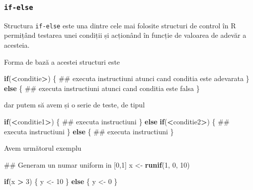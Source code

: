 \documentclass[]{article}
\newenvironment{Shaded}{\begin{snugshade}}{\end{snugshade}}
\newcommand{\KeywordTok}[1]{\textcolor[rgb]{0.13,0.29,0.53}{\textbf{#1}}}
\newcommand{\DecValTok}[1]{\textcolor[rgb]{0.00,0.00,0.81}{#1}}
\newcommand{\StringTok}[1]{\textcolor[rgb]{0.31,0.60,0.02}{#1}}
\newcommand{\ControlFlowTok}[1]{\textcolor[rgb]{0.13,0.29,0.53}{\textbf{#1}}}
\newcommand{\OperatorTok}[1]{\textcolor[rgb]{0.81,0.36,0.00}{\textbf{#1}}}
\newcommand{\NormalTok}[1]{#1}
\begin{document}
\subsubsection{\texorpdfstring{\texttt{if-else}}{if-else}}\label{if-else}

Structura \texttt{if-else} este una dintre cele mai folosite structuri
de control în R permițând testarea unei condiții și acționând în funcție
de valoarea de adevăr a acesteia.

Forma de bază a acestei structuri este

\begin{Shaded}
\begin{Highlighting}[]
\ControlFlowTok{if}\NormalTok{(}\OperatorTok{<}\NormalTok{conditie}\OperatorTok{>}\NormalTok{) \{}
\NormalTok{        ## executa instructiuni atunci cand conditia este adevarata}
\NormalTok{\} }
\ControlFlowTok{else}\NormalTok{ \{}
\NormalTok{        ## executa instructiuni atunci cand conditia este falsa}
\NormalTok{\}}
\end{Highlighting}
\end{Shaded}

dar putem să avem și o serie de teste, de tipul

\begin{Shaded}
\begin{Highlighting}[]
\ControlFlowTok{if}\NormalTok{(}\OperatorTok{<}\NormalTok{conditie1}\OperatorTok{>}\NormalTok{) \{}
\NormalTok{        ## executa instructiuni}
\NormalTok{\} }\ControlFlowTok{else} \ControlFlowTok{if}\NormalTok{(}\OperatorTok{<}\NormalTok{conditie2}\OperatorTok{>}\NormalTok{)  \{}
\NormalTok{        ## executa instructiuni}
\NormalTok{\} }\ControlFlowTok{else}\NormalTok{ \{}
\NormalTok{        ## executa instructiuni}
\NormalTok{\}}
\end{Highlighting}
\end{Shaded}

Avem următorul exemplu

\begin{Shaded}
\begin{Highlighting}[]
\NormalTok{## Generam un numar uniform in [0,1]}
\NormalTok{x <-}\StringTok{ }\KeywordTok{runif}\NormalTok{(}\DecValTok{1}\NormalTok{, }\DecValTok{0}\NormalTok{, }\DecValTok{10}\NormalTok{)  }

\ControlFlowTok{if}\NormalTok{(x }\OperatorTok{>}\StringTok{ }\DecValTok{3}\NormalTok{) \{}
\NormalTok{        y <-}\StringTok{ }\DecValTok{10}
\NormalTok{\} }\ControlFlowTok{else}\NormalTok{ \{}
\NormalTok{        y <-}\StringTok{ }\DecValTok{0}
\NormalTok{\}}
\end{Highlighting}
\end{Shaded}
\end{document}
